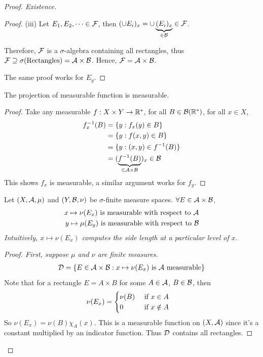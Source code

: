 \documentclass[11pt]{article}
\begin{document}
\begin{theorem}
\begin{proof}[Proof. Existence]
\begin{tcolorbox}
\begin{proof}
				(iii) Let $E_1, E_2, \dots \in \mathcal{{F}}$, then $(\cup E_i)_x = \cup \underbrace{(E_i)_x}_{\in \mathcal{{B}}} \in \mathcal{{F}}$.
				
				Therefore, $\mathcal{{F}}$ is a $\sigma$-algebra containing all rectangles, thus $\mathcal{{F}} \supseteq \sigma(\text{{Rectangles}}) = \mathcal{{A}} \times \mathcal{{B}}$. Hence, $\mathcal{{F}} = \mathcal{{A}} \times \mathcal{{B}}$.
				
				The same proof works for $E_y$.
			\end{proof}
			\end{tcolorbox}
			\begin{tcolorbox}
			\begin{lemma}
			The projection of measurable function is measurable.
			\begin{proof}
			Take any measurable $f: X \times Y \to \mathbb{R}^*$, for all $B \in \mathcal{{B}}(\mathbb{R}^*)$, for all $x \in X$,
			\begin{align}
				f_x^{-1}(B) &= \{y : f_x(y) \in B\} \\
				&= \{y : f (x, y) \in B\} \\
				&= \{y : (x, y) \in f^{-1}(B) \} \\
				&= (\underbrace{f^{-1}(B)}_{\in \mathcal{{A}} \times \mathcal{{B}}})_x \in \mathcal{{B}}
			\end{align}
			This shows $f_x$ is measurable, a similar argument works for $f_y$.
			\end{proof}
			\end{lemma}
			\end{tcolorbox}
			\begin{proposition}
				Let $(X, \mathcal{{A}}, \mu)$ and $(Y, \mathcal{{B}}, \nu)$ be $\sigma$-finite measure spaces. $\forall E \in \mathcal{{A}} \times \mathcal{{B}}$,
				\begin{align}
					x \mapsto \nu(E_x) \text{{ is measurable with respect to $\mathcal{{A}}$}} \\
					y \mapsto \mu(E_y) \text{{ is measurable with respect to $\mathcal{{B}}$}}
				\end{align}
				\emph{Intuitively, $x \mapsto \nu(E_x)$ computes the side length at a particular level of $x$.}
				\begin{proof}[Proof. First, suppose $\mu$ and $\nu$ are finite measures]
					\begin{align}
						\mathcal{{D}} = \{E \in \mathcal{{A}} \times \mathcal{{B}} : x \mapsto \nu(E_x) \text{{ is }} \mathcal{{A}} \text{{ measurable}}\}
					\end{align}
					Note that for a rectangle $E = A \times B$ for some $A \in \mathcal{{A}}$, $B \in \mathcal{{B}}$, then
					\begin{align}
						\nu(E_x) &=\begin{cases}
							\nu(B) &\text{{ if }} x \in A \\
							0 &\text{{ if }} x \notin A
						\end{cases}
					\end{align}
					So $\nu(E_x) = \nu(B) \chi_A(x)$. This is a measurable function on $(X, \mathcal{{A}})$ since it's a constant multiplied by an indicator function.
					Thus $\mathcal{{D}}$ contains all rectangles.
					

\end{proof}
\end{proposition}
\end{proof}
\end{theorem}
\end{document}
